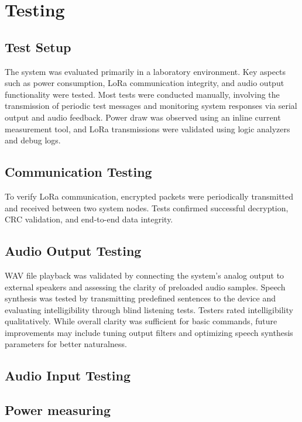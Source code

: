 \documentclass[conference]{IEEEtran}
\begin{document}




\section{Testing}

\subsection{Test Setup}
The system was evaluated primarily in a laboratory environment. Key aspects such as power consumption, LoRa communication integrity, and audio output functionality were tested. Most tests were conducted manually, involving the transmission of periodic test messages and monitoring system responses via serial output and audio feedback. Power draw was observed using an inline current measurement tool, and LoRa transmissions were validated using logic analyzers and debug logs.

\subsection{Communication Testing}
To verify LoRa communication, encrypted packets were periodically transmitted and received between two system nodes. Tests confirmed successful decryption, CRC validation, and end-to-end data integrity.

\subsection{Audio Output Testing}
WAV file playback was validated by connecting the system's analog output to external speakers and assessing the clarity of preloaded audio samples. Speech synthesis was tested by transmitting predefined sentences to the device and evaluating intelligibility through blind listening tests. Testers rated intelligibility qualitatively. While overall clarity was sufficient for basic commands, future improvements may include tuning output filters and optimizing speech synthesis parameters for better naturalness.

\subsection{Audio Input Testing}

\subsection{Power measuring}
\end{document}
